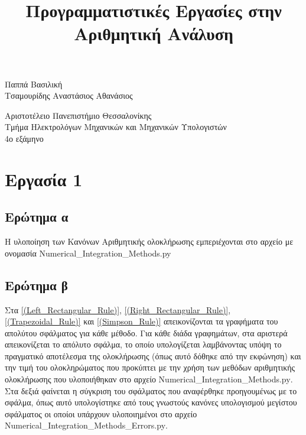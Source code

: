 \documentclass{article}
\title{Προγραμματιστικές Εργασίες στην Αριθμητική Ανάλυση \\}
\author{}
\date{}
\begin{document}
\maketitle
\vspace*{\fill}
\begin{center}
    \begin{large}
    Παππά Βασιλική \\ Τσαμουρίδης Αναστάσιος Αθανάσιος \\
    \end{large}
    \vspace*{\fill}
    Αριστοτέλειο Πανεπιστήμιο Θεσσαλονίκης\\
    Τμήμα Ηλεκτρολόγων Μηχανικών και Μηχανικών Υπολογιστών\\
    4ο εξάμηνο\\
\end{center}
\newpage

\tableofcontents
\newpage

\section{Εργασία 1}
\vspace*{\fill}
\subsection{Ερώτημα α}

Η υλοποίηση των Κανόνων Αριθμητικής ολοκλήρωσης εμπεριέχονται στο αρχείο με ονομασία
\foreignlanguage{english}{Numerical\_Integration\_Methods.py}
\vspace*{\fill}
\subsection{Ερώτημα β}
Στα \autoref{(Left_Rectangular_Rule)}, \autoref{(Right_Rectangular_Rule)}, \autoref{(Trapezoidal_Rule)} και \autoref{(Simpson_Rule)} απεικονίζονται τα γραφήματα του απολύτου σφάλματος για κάθε μέθοδο. Για κάθε διάδα γραφημάτων, στα αριστερά απεικονίζεται το απόλυτο σφάλμα, το οποίο υπολογίζεται λαμβάνοντας υπόψη το πραγματικό αποτέλεσμα της ολοκλήρωσης (όπως αυτό δόθηκε από την εκφώνηση) και την τιμή του ολοκληρώματος που προκύπτει με την χρήση των μεθόδων αριθμητικής ολοκλήρωσης που υλοποιήθηκαν στο αρχείο \foreignlanguage{english}{Numerical\_Integration\_Methods.py}. Στα δεξιά φαίνεται η σύγκριση του σφάλματος που αναφέρθηκε προηγουμένως με το σφάλμα, όπως αυτό υπολογίστηκε από τους γνωστούς κανόνες υπολογισμού μεγίστου σφάλματος οι οποίοι υπάρχουν υλοποιημένοι στο αρχείο \foreignlanguage{english}{Numerical\_Integration\_Methods\_Errors.py}.  
\end{document}
